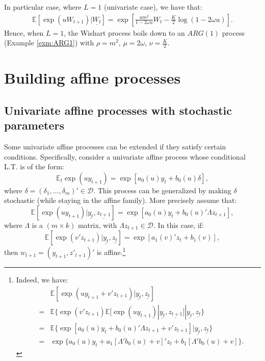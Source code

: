 \documentclass[
  12pt,
]{book}
\theoremstyle{definition}
\theoremstyle{definition}
\theoremstyle{definition}
\theoremstyle{definition}
\theoremstyle{remark}
\begin{document}
In particular case, where \(L=1\) (univariate case), we have that:
\begin{eqnarray*}
\mathbb{E}[\exp(u W_{t+1})|\underline{W_t}] = \exp\left[
\frac{u m^2}{1-2\omega u}W_t -
\frac{K}{2}   \log(1-2\omega u)\right].
\end{eqnarray*}
Hence, when \(L=1\), the Wishart process boils down to an \(ARG(1)\) process (Example \ref{exm:ARG1}) with \(\rho = m^2\), \(\mu = 2\omega\), \(\nu = \frac{K}{2}\).

\hypertarget{building}{%
\section{Building affine processes}\label{building}}

\hypertarget{stoch}{%
\subsection{Univariate affine processes with stochastic parameters}\label{stoch}}

Some univariate affine processes can be extended if they satisfy certain conditions. Specifically, consider a univariate affine process whose conditional L.T. is of the form:
\begin{equation}
\mathbb{E}_t   \exp(u y_{t+1}) = \exp[a_0(u)y_t+b_0(u)\delta],\label{eq:extaffine}
\end{equation}
where \(\delta = (\delta_1,\dots,\delta_m)' \in \mathcal{D}\). This process can be generalized by making \(\delta\) stochastic (while staying in the affine family). More precisely assume that:
\[
\mathbb{E}[\exp(u y_{t+1})|\underline{y_t}, \underline{z_{t+1}}] = \exp[a_0(u)y_t+b_0(u)'\Lambda z_{t+1}],
\]
where \(\Lambda\) is a \((m\times k)\) matrix, with \(\Lambda z_{t+1} \in \mathcal{D}\). In this case, if:
\[
\mathbb{E}[\exp(v' z_{t+1})|\underline{y_t}, \underline{z_{t}}] = \exp[a_1(v)'z_t+b_1(v)],
\]
then \(w_{t+1} = (y_{t+1}, z'_{t+1})'\) is affine.\footnote{Indeed, we have:
  \begin{eqnarray*}
  &&\mathbb{E}[\exp(u y_{t+1}+v'z_{t+1})|\underline{y_t}, \underline{z_{t}}] \\
  &=& \mathbb{E}\{\exp(v' z_{t+1})\mathbb{E}[\exp(u y_{t+1})|\underline{y_t},
  \underline{z_{t+1}}]|\underline{y_t}, \underline{z_{t}} \} \\
  &=& \mathbb{E}\{\exp[a_0(u) y_{t}+b_0(u)'\Lambda z_{t+1}+v'z_{t+1}]|\underline{y_t},
  \underline{z_{t}} \} \\
  &=& \exp\{ a_0(u) y_{t}+a_1[\Lambda' b_0(u)+v]'z_t+b_1 [\Lambda' b_0(u)+v]\}.
  \end{eqnarray*}}
\end{document}
